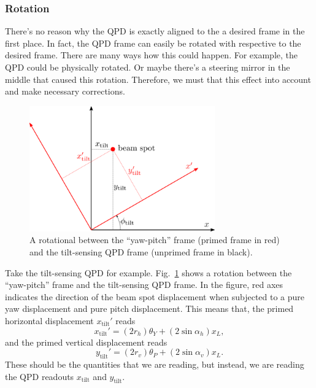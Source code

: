 \subsubsection{Rotation}
There's no reason why the QPD is exactly aligned to the a desired frame in the first place.
In fact, the QPD frame can easily be rotated with respective to the desired frame.
There are many ways how this could happen.
For example, the QPD could be physically rotated.
Or maybe there's a steering mirror in the middle that caused this rotation.
Therefore, we must that this effect into account and make necessary corrections.

\begin{figure}[!h]
	\centering
	\includegraphics[width=80mm]{figures/rotation}
	\caption{A rotational between the ``yaw-pitch'' frame (primed frame in red) and the tilt-sensing QPD frame (unprimed frame in black).}
	\label{fig:rotation}
\end{figure}
Take the tilt-sensing QPD for example.
Fig.~\ref{fig:rotation} shows a rotation between the ``yaw-pitch'' frame and the tilt-sensing QPD frame.
In the figure, red axes indicates the direction of the beam spot displacement when subjected to a pure yaw displacement and pure pitch displacement.
This means that, the primed horizontal displacement $x_\mathrm{tilt}'$ reads
\begin{equation}
	x_\mathrm{tilt}'=\left(2r_h\right)\theta_Y + \left(2\sin\alpha_h\right)x_L,
\end{equation}
and the primed vertical displacement reads
\begin{equation}
	y_\mathrm{tilt}'=\left(2r_v\right)\theta_P + \left(2\sin\alpha_v\right)x_L.
\end{equation}
These should be the quantities that we are reading, but instead, we are reading the QPD readouts $x_\mathrm{tilt}$ and $y_\mathrm{tilt}$.


